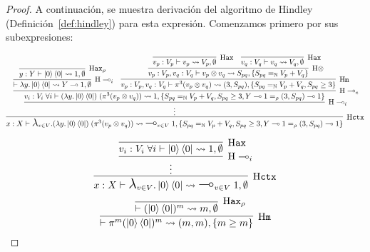 \begin{proof}
    A continuación, se muestra derivación del algoritmo de Hindley (Definición~\ref{def:hindley}) para esta expresión. Comenzamos primero por sus subexpresiones:
\footnotesize
\begin{adjustwidth}{-30pt}{-30pt}
\begin{equation}\label{eq:csi_tip}
\infer[\text{H}\mathtt{ctx}]
{x:X\vdash \biglambda_{v\in V}.(\lambda y. \ket{0}\bra{0})\;(\pi^3 (v_p \otimes v_q))\leadsto \bigmultimap_{v\in V}\;1, \{S_{pq} =_\mathbb{N} V_p+V_q, S_{pq} \geq 3, Y\multimap 1 =_\rho (3, S_{pq}) \multimap 1\}}
{\infer[\text{H}\multimap_i]
    {\vdots}
    {\infer[\text{H}\multimap_e]
        {v_i:V_i \;\forall i\vdash (\lambda y. \ket{0}\bra{0})\;(\pi^3 (v_p \otimes v_q)) \leadsto 1, \{S_{pq} =_\mathbb{N} V_p+V_q, S_{pq} \geq 3, Y\multimap 1 =_\rho (3, S_{pq}) \multimap 1\}}
        {\infer[\text{H}\multimap_i]
            {\vdash \lambda y. \ket{0}\bra{0} \leadsto Y\multimap 1, \emptyset}
            {\infer[\text{H}\mathtt{ax}_\rho]
                {y:Y \vdash \ket{0}\bra{0} \leadsto 1, \emptyset}
                {}
            }
        \quad \infer[\text{H}\mathtt{m}]
            {v_p:V_p, v_q:V_q \vdash \pi^3 (v_p \otimes v_q) \leadsto (3, S_{pq}), \{S_{pq} =_\mathbb{N} V_p+V_q, S_{pq} \geq 3\}}
            {\infer[\text{H}\otimes]
                {v_p:V_p, v_q:V_q \vdash v_p \otimes v_q \leadsto S_{pq}, \{S_{pq} =_\mathbb{N} V_p+V_q\}}
                {\infer[\text{H}\mathtt{ax}]
                    {v_p: V_p \vdash v_p \leadsto V_p, \emptyset}
                    {}
                \quad \infer[\text{H}\mathtt{ax}]
                    {v_q: V_q \vdash v_q \leadsto V_q, \emptyset}
                    {}
                }
            }
        }
    }
}
\end{equation}
\end{adjustwidth}
\vspace{\baselineskip}
\begin{equation}\label{eq:fill_tip}
\infer[\text{H}\mathtt{ctx}]
{x:X\vdash \biglambda_{v\in V}.\ket{0}\bra{0}\leadsto \bigmultimap_{v\in V}\;1, \emptyset}
{\infer[\text{H}\multimap_i]
    {\vdots}
    {\infer[\text{H}\mathtt{ax}]
        {v_i:V_i \;\forall i\vdash \ket{0}\bra{0} \leadsto 1, \emptyset}
        {}
    }
}
\end{equation}
\vspace{\baselineskip}
\begin{equation}\label{eq:meas_var}
\infer[\text{H}\mathtt{m}]
{\vdash \pi^m (\ket{0}\bra{0})^m \leadsto (m, m), \{m\geq m\}}
{\infer[\text{H}\mathtt{ax}_\rho]
    {\vdash (\ket{0}\bra{0})^m \leadsto m, \emptyset}
    {}
}
\end{equation}



\end{proof}
